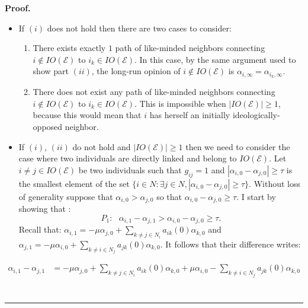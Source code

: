 \documentclass{article}
\newenvironment{proof}[1][Proof]{\textbf{#1.} }{\ \rule{0.5em}{0.5em}}
\begin{document}
\begin{proof}
\begin{itemize}
\item If $(i)$ does not hold then there are two cases to consider:
\begin{enumerate}
\item There exists exactly $1$ path of like-minded neighbors connecting $i \not \in {IO}(\mathcal{E})$ to $i_k \in {IO}(\mathcal{E})$. In this case, by the same argument used to show part $(ii)$, the long-run opinion of $i \not \in {IO}(\mathcal{E})$ is $\alpha_{i,\infty} = \alpha_{i_k,\infty}$.
\item There does not exist any path of like-minded neighbors connecting $i \not \in {IO}(\mathcal{E})$ to $i_k \in {IO}(\mathcal{E})$. This is impossible when $| {IO}(\mathcal{E})| \geq 1$, because this would mean that $i$ has herself an initially ideologically-opposed neighbor. 
\end{enumerate}
\item If $(i)$, $(ii)$ do not hold and $|{IO}(\mathcal{E})| \geq 1$ then we need to consider the case where two individuals are directly linked and belong to ${IO}(\mathcal{E})$. Let $i \neq j \in {IO}(\mathcal{E})$ be two individuals such that $g_{ij}=1$ and $|\alpha_{i,0} - \alpha_{j,0}| \geq \tau $ is the smallest element of the set $ \{ i \in N : \exists j \in N , |\alpha_{i,0} - \alpha_{j,0}| \geq \tau \}$. Without loss of generality suppose that $\alpha_{i,0} > \alpha_{j,0}$ so that $\alpha_{i,0} - \alpha_{j,0} \geq \tau $. I start by showing that : 
$$ P_1: \text{ } \alpha_{i,1} - \alpha_{j,1} > \alpha_{i,0} - \alpha_{j,0} \geq \tau.$$ 
\noindent Recall that: $\alpha_{i,1} = - \mu  \alpha_{j,0} + \sum \limits_{k \neq j \in N_i} a_{ik} (0) \alpha_{k,0}$ and $\alpha_{j,1} = - \mu  \alpha_{i,0} + \sum \limits_{k \neq i \in N_j} a_{jk} (0) \alpha_{k,0} $. It follows that their difference writes:
\end{itemize}
\begin{align*}
\alpha_{i,1} - \alpha_{j,1} & = - \mu  \alpha_{j,0} + \sum \limits_{k \neq j \in N_i} a_{ik} (0) \alpha_{k,0} + \mu  \alpha_{i,0} - \sum \limits_{k \neq i \in N_j} a_{jk} (0) \alpha_{k,0} \\

\end{align*}
\end{proof}
\end{document}
